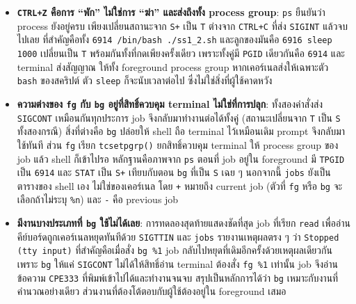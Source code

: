 \documentclass[a4paper,11pt]{article}
\newcommand{\code}[1]{\texttt{#1}}
\begin{document}
\begin{itemize}[leftmargin=*]
  \item \textbf{\code{CTRL+Z} คือการ ``พัก'' ไม่ใช่การ ``ฆ่า'' และส่งถึงทั้ง process group}:
        \code{ps} ยืนยันว่า process ยังอยู่ครบ เพียงเปลี่ยนสถานะจาก \code{S+}
        เป็น \code{T} ต่างจาก \code{CTRL+C} ที่ส่ง \code{SIGINT} แล้วจบไปเลย
        ที่สำคัญคือทั้ง \code{6914 /bin/bash ./ss1\_2.sh} และลูกของมันคือ
        \code{6916 sleep 1000} เปลี่ยนเป็น \code{T} พร้อมกันทั้งที่กดเพียงครั้งเดียว
        เพราะทั้งคู่มี \code{PGID} เดียวกันคือ \code{6914} และ terminal ส่งสัญญาณ
        ให้ทั้ง foreground process group หากเคอร์เนลส่งให้เฉพาะตัว \code{bash}
        ของสคริปต์ ตัว \code{sleep} ก็จะนับเวลาต่อไป ซึ่งไม่ใช่สิ่งที่ผู้ใช้คาดหวัง

  \item \textbf{ความต่างของ \code{fg} กับ \code{bg} อยู่ที่สิทธิ์ควบคุม terminal
        ไม่ใช่ที่การปลุก}: ทั้งสองคำสั่งส่ง \code{SIGCONT} เหมือนกันทุกประการ
        job จึงกลับมาทำงานต่อได้ทั้งคู่ (สถานะเปลี่ยนจาก \code{T} เป็น \code{S}
        ทั้งสองกรณี) สิ่งที่ต่างคือ \code{bg} ปล่อยให้ shell ถือ terminal ไว้เหมือนเดิม
        prompt จึงกลับมาใช้ทันที ส่วน \code{fg} เรียก \code{tcsetpgrp()}
        ยกสิทธิ์ควบคุม terminal ให้ process group ของ job แล้ว shell ก็เข้าไปรอ
        หลักฐานคือภาพจาก \code{ps} ตอนที่ job อยู่ใน foreground มี \code{TPGID}
        เป็น \code{6914} และ \code{STAT} เป็น \code{S+} เทียบกับตอน \code{bg}
        ที่เป็น \code{S} เฉย ๆ นอกจากนี้ \code{jobs} ยังเป็นตารางของ shell เอง
        ไม่ใช่ของเคอร์เนล โดย \code{+} หมายถึง current job (ตัวที่ \code{fg}
        หรือ \code{bg} จะเลือกถ้าไม่ระบุ \code{\%n}) และ \code{-} คือ previous job

  \item \textbf{มีงานบางประเภทที่ \code{bg} ใช้ไม่ได้เลย}: การทดลองสุดท้ายแสดงชัดที่สุด
        job ที่เรียก \code{read} เพื่ออ่านคีย์บอร์ดถูกเคอร์เนลหยุดทันทีด้วย
        \code{SIGTTIN} และ \code{jobs} รายงานเหตุผลตรง ๆ ว่า \code{Stopped (tty input)}
        ที่สำคัญคือเมื่อสั่ง \code{bg \%1} job กลับไปหยุดที่เดิมอีกครั้งด้วยเหตุผลเดียวกัน
        เพราะ \code{bg} ให้แค่ \code{SIGCONT} ไม่ได้ให้สิทธิ์อ่าน terminal
        ต้องสั่ง \code{fg \%1} เท่านั้น job จึงอ่านข้อความ \code{CPE333}
        ที่พิมพ์เข้าไปได้และทำงานจนจบ สรุปเป็นหลักการได้ว่า \code{bg}
        เหมาะกับงานที่คำนวณอย่างเดียว ส่วนงานที่ต้องโต้ตอบกับผู้ใช้ต้องอยู่ใน foreground เสมอ


\end{itemize}
\end{document}
